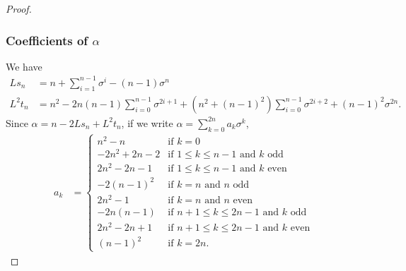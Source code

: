 \documentclass{article}
\theoremstyle{plain}
\theoremstyle{definition}
\theoremstyle{remark}
\begin{document}
\begin{proof}
\subsubsection*{Coefficients of $\alpha$}
We have
\begin{align*}
    Ls_{n} &= n + \sum_{i=1}^{n-1}\sigma^i - (n-1)\sigma^n \\
    L^2t_{n} &= n^2 - 2n(n-1)\sum_{i=0}^{n-1}\sigma^{2i+1} + (n^2+(n-1)^2) \sum_{i=0}^{n-1} \sigma^{2i+2} + (n-1)^2 \sigma^{2n}.
\end{align*}
Since $\alpha = n - 2Ls_{n} + L^2t_{n}$, if we write $\alpha = \sum_{k=0}^{2n} a_{k}\sigma^k$, 
\begin{align*}
    a_{k} &= \begin{cases} 
    n^2-n &\text{if } k=0\\
    -2n^2+2n-2 &\text{if } 1\le k\le n-1 \text{ and } k \text{ odd}\\
    2n^2-2n-1 &\text{if } 1\le k\le n-1 \text{ and } k \text{ even}\\
    -2(n-1)^2 &\text{if } k=n \text{ and } n \text{ odd}\\
    2n^2-1 &\text{if } k=n \text{ and } n \text{ even}\\
    -2n(n-1) &\text{if } n+1\le k\le 2n-1 \text{ and } k \text{ odd}\\
    2n^2-2n+1 &\text{if } n+1\le k\le 2n-1 \text{ and } k \text{ even}\\
    (n-1)^2 &\text{if } k=2n.
    \end{cases}
\end{align*}


\end{proof}
\end{document}
